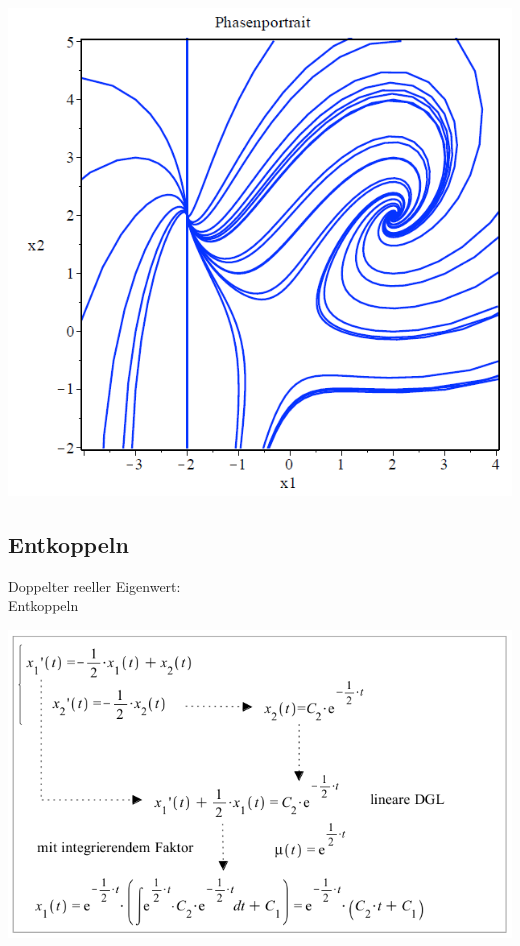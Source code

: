 \begin{minipage}[h]{0.35\textwidth}
	\includegraphics[width=1.0\textwidth]{images/Phasenportrait.png}
\end{minipage}



\subsection{Entkoppeln}
\begin{minipage}[h]{0.35\textwidth}
Doppelter reeller Eigenwert:\\ Entkoppeln
\end{minipage}
\begin{minipage}[h]{0.5\textwidth}
	\includegraphics[width=1.0\textwidth]{images/Entkoppeln.png}
\end{minipage}

